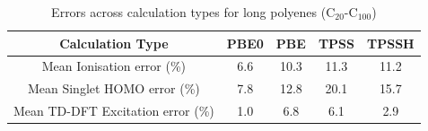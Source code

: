 \documentclass[12pt]{article}
\begin{document}
\begin{table}[h]
\caption{Errors across calculation types for long polyenes (C\(_{20}\)-C\(_{100}\))}
\begin{tabular}{c c c c c }
\hline
Calculation Type & PBE0 & PBE & TPSS & TPSSH \\
\hline
Mean Ionisation  error (\%) & 6.6 & 10.3 & 11.3 & 11.2 \\
Mean Singlet HOMO  error (\%) & 7.8 & 12.8 & 20.1 & 15.7 \\
Mean TD-DFT Excitation error (\%) & 1.0 & 6.8 & 6.1 & 2.9 \\ 
\hline
\end{tabular}
\label{table:long_alkene_errors}
\end{table}

\newpage
\end{document}
